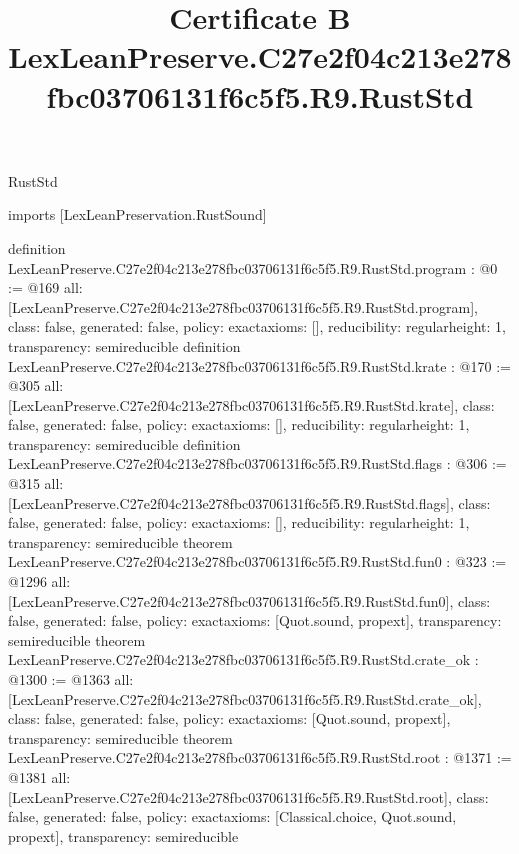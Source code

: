 \begin{lexlean}{RustStd}
\title{Certificate B LexLeanPreserve.C27e2f04c213e278fbc03706131f6c5f5.R9.RustStd}
\begin{coremodule}
imports [LexLeanPreservation.RustSound]

definition LexLeanPreserve.C27e2f04c213e278fbc03706131f6c5f5.R9.RustStd.program : @0 := @169 {
  all: [LexLeanPreserve.C27e2f04c213e278fbc03706131f6c5f5.R9.RustStd.program],
  class: false,
  generated: false,
  policy: exact{axioms: []},
  reducibility: regular{height: 1},
  transparency: semireducible
}
definition LexLeanPreserve.C27e2f04c213e278fbc03706131f6c5f5.R9.RustStd.krate : @170 := @305 {
  all: [LexLeanPreserve.C27e2f04c213e278fbc03706131f6c5f5.R9.RustStd.krate],
  class: false,
  generated: false,
  policy: exact{axioms: []},
  reducibility: regular{height: 1},
  transparency: semireducible
}
definition LexLeanPreserve.C27e2f04c213e278fbc03706131f6c5f5.R9.RustStd.flags : @306 := @315 {
  all: [LexLeanPreserve.C27e2f04c213e278fbc03706131f6c5f5.R9.RustStd.flags],
  class: false,
  generated: false,
  policy: exact{axioms: []},
  reducibility: regular{height: 1},
  transparency: semireducible
}
theorem LexLeanPreserve.C27e2f04c213e278fbc03706131f6c5f5.R9.RustStd.fun0 : @323 := @1296 {
  all: [LexLeanPreserve.C27e2f04c213e278fbc03706131f6c5f5.R9.RustStd.fun0],
  class: false,
  generated: false,
  policy: exact{axioms: [Quot.sound, propext]},
  transparency: semireducible
}
theorem LexLeanPreserve.C27e2f04c213e278fbc03706131f6c5f5.R9.RustStd.crate_ok : @1300 := @1363 {
  all: [LexLeanPreserve.C27e2f04c213e278fbc03706131f6c5f5.R9.RustStd.crate_ok],
  class: false,
  generated: false,
  policy: exact{axioms: [Quot.sound, propext]},
  transparency: semireducible
}
theorem LexLeanPreserve.C27e2f04c213e278fbc03706131f6c5f5.R9.RustStd.root : @1371 := @1381 {
  all: [LexLeanPreserve.C27e2f04c213e278fbc03706131f6c5f5.R9.RustStd.root],
  class: false,
  generated: false,
  policy: exact{axioms: [Classical.choice, Quot.sound, propext]},
  transparency: semireducible
}


\end{coremodule}
\end{lexlean}
